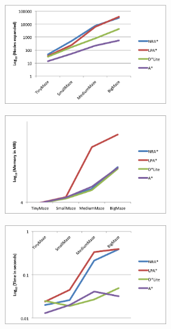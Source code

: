 	\begin{figure}[htb!]
		\centering
		\includegraphics[width=7cm]{NodesExpanded.png}
		\caption{}
		\label{fig:2}
	\end{figure}

	\begin{figure}[htb!]
		\centering
		\includegraphics[width=7cm]{Memory.png}
		\caption{}
		\label{fig:3}
	\end{figure}

	\begin{figure}[htb!]
		\centering
		\includegraphics[width=7cm]{Time.png}
		\caption{}
		\label{fig:4}
	\end{figure}

	